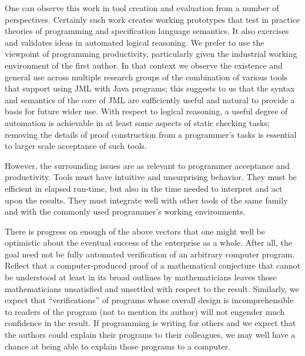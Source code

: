\documentclass{llncs}
\begin{document}
One can observe this work in tool creation and evaluation from a
number of perspectives.  Certainly such work creates working
prototypes that test in practice theories of programming and
specification language semantics.  It also exercises and validates
ideas in automated logical reasoning.  We prefer to use the viewpoint
of programming productivity, particularly given the industrial working
environment of the first author.  In that context we observe the
existence and general use across multiple research groups of the
combination of various tools that support using JML with Java
programs; this suggests to us that the syntax and semantics of the
core of JML are sufficiently useful and natural to provide a basis for
future wider use.  With respect to logical reasoning, a useful degree
of automation is achievable in at least some aspects of static
checking tasks; removing the details of proof construction from a
programmer's tasks is essential to larger scale acceptance of such
tools.

However, the surrounding issues are as relevant to programmer
acceptance and productivity.  Tools must have intuitive and
unsurprising behavior. They must be efficient in elapsed run-time, but
also in the time needed to interpret and act upon the results.  They
must integrate well with other tools of the same family and with the
commonly used programmer's working environments.


There is progress on enough of the above vectors that one might well
be optimistic about the eventual success of the enterprise as a whole.
After all, the goal need not be fully automated verification of an
arbitrary computer program.  Reflect that a computer-produced proof of
a mathematical conjecture that cannot be understood at least in its
broad outlines by mathematicians leaves those mathematicians
unsatisfied and unsettled with respect to the result.  Similarly, we
expect that ``verifications'' of programs whose overall design is
incomprehensible to readers of the program (not to mention its author)
will not engender much confidence in the result.  If programming is
writing for others and we expect that the authors could explain their
programs to their colleagues, we may well have a chance at being able
to explain those programs to a computer.

\end{document}
